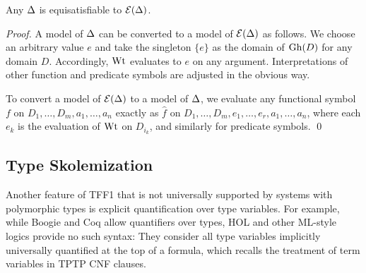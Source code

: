 \begin{theorem} \label{thm:eli}
Any $\mathrm{\Delta}$ is equisatisfiable to $\mathcal{E}(\mathrm{\Delta})$.
\end{theorem}
\begin{proof}
A model of $\mathrm{\Delta}$ can be converted to a model of $\mathcal{E}(\mathrm{\Delta})$
as follows. We choose an arbitrary value $e$ and take the singleton
$\{ e \}$ as the domain of $\mathrm{Gh}(D)$ for any domain $D$.
Accordingly, $\mathrm{Wt}$ evaluates to $e$ on any argument.
Interpretations of other function and predicate symbols are
adjusted in the obvious way.

\pagebreak[2] %

To convert a model of $\mathcal{E}(\mathrm{\Delta})$
to a model of $\mathrm{\Delta}$, we evaluate any functional symbol
$f$ on $D_1,\dots,D_m,a_1,\dots,a_n$ exactly as
$\hat{f}$ on $D_1,\dots,D_m,e_1,\dots,e_r,a_1,\dots,a_n$,
where each $e_k$ is the evaluation of $\mathrm{Wt}$ on $D_{i_k}$, and similarly
for predicate symbols.
\qed
\end{proof}

\subsection{Type Skolemization} \label{ssec:skol}

Another feature of TFF1 that is not universally supported
by systems with polymorphic types is explicit
quantification over type variables.
For example, while Boogie \cite{leino-ruemmer-2010} and Coq \cite{bertot-casteran-2004}
allow quantifiers over types, %
HOL and other ML-style logics provide no such syntax:
They consider all type variables
implicitly universally quantified at the top of a formula, which
recalls the treatment of term variables in TPTP CNF clauses.

